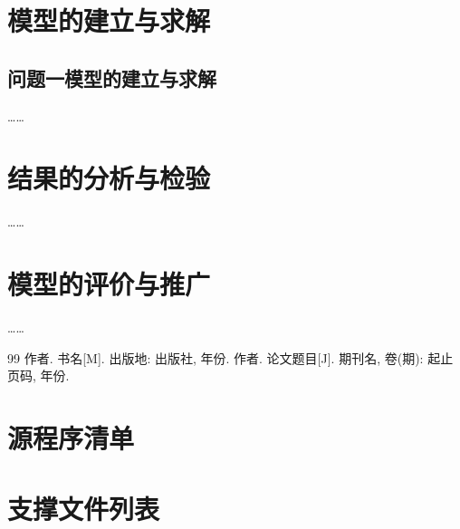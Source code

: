 \documentclass[withoutpreface,bwprint]{cumcmthesis}
\begin{document}
\section{模型的建立与求解}
\subsection{问题一模型的建立与求解}
……

\section{结果的分析与检验}
……

\section{模型的评价与推广}
……

\begin{thebibliography}{99}
 作者. 书名[M]. 出版地: 出版社, 年份.
 作者. 论文题目[J]. 期刊名, 卷(期): 起止页码, 年份.
\end{thebibliography}

\appendix
\section{源程序清单}
\section{支撑文件列表}
\end{document}
